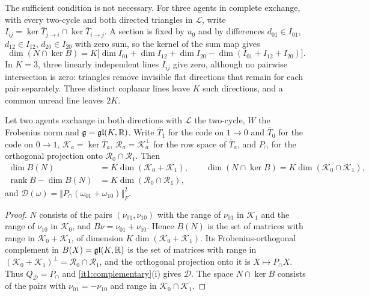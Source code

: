The sufficient condition is not necessary. For three agents in complete exchange, with every two-cycle and both directed triangles in $\mathcal L$, write $I_{ij}=\ker\bar T_{j\to i}\cap\ker\bar T_{i\to j}$. A section is fixed by $u_0$ and by differences $d_{01}\in I_{01}$, $d_{12}\in I_{12}$, $d_{20}\in I_{20}$ with zero sum, so the kernel of the sum map gives
\begin{equation}
\dim(N\cap\ker B)=K\bigl[\dim I_{01}+\dim I_{12}+\dim I_{20}-\dim(I_{01}+I_{12}+I_{20})\bigr].
\label{it1:three-agent-count}
\end{equation}
In $K=3$, three linearly independent lines $I_{ij}$ give zero, although no pairwise intersection is zero: triangles remove invisible flat directions that remain for each pair separately. Three distinct coplanar lines leave $K$ such directions, and a common unread line leaves $2K$.

Let two agents exchange in both directions with $\mathcal L$ the two-cycle, $W$ the Frobenius norm and $\mathfrak g=\mathfrak{gl}(K,\mathbb R)$. Write $\bar T_1$ for the code on $1\to0$ and $\bar T_0$ for the code on $0\to1$, $\mathcal K_a=\ker\bar T_a$, $\mathcal R_a=\mathcal K_a^\perp$ for the row space of $\bar T_a$, and $P_\cap$ for the orthogonal projection onto $\mathcal R_0\cap\mathcal R_1$. Then
\begin{equation}
\begin{aligned}
\dim B(N)&=K\dim(\mathcal K_0+\mathcal K_1),\qquad
\dim(N\cap\ker B)=K\dim(\mathcal K_0\cap\mathcal K_1),\\
\operatorname{rank}B-\dim B(N)&=K\dim(\mathcal R_0\cap\mathcal R_1),
\end{aligned}
\label{it1:pair-split}
\end{equation}
and $\mathcal D(\omega)=\Vert P_\cap(\omega_{01}+\omega_{10})\Vert_F^2$.
\begin{proof}
$N$ consists of the pairs $(\nu_{01},\nu_{10})$ with the range of $\nu_{01}$ in $\mathcal K_1$ and the range of $\nu_{10}$ in $\mathcal K_0$, and $B\nu=\nu_{01}+\nu_{10}$. Hence $B(N)$ is the set of matrices with range in $\mathcal K_0+\mathcal K_1$, of dimension $K\dim(\mathcal K_0+\mathcal K_1)$. Its Frobenius-orthogonal complement in $B(X)=\mathfrak{gl}(K,\mathbb R)$ is the set of matrices with range in $(\mathcal K_0+\mathcal K_1)^\perp=\mathcal R_0\cap\mathcal R_1$, and the orthogonal projection onto it is $X\mapsto P_\cap X$. Thus $Q_{\mathcal D}=P_\cap$ and \cref{it1:complementary}(i) gives $\mathcal D$. The space $N\cap\ker B$ consists of the pairs with $\nu_{01}=-\nu_{10}$ and range in $\mathcal K_0\cap\mathcal K_1$.
\end{proof}

